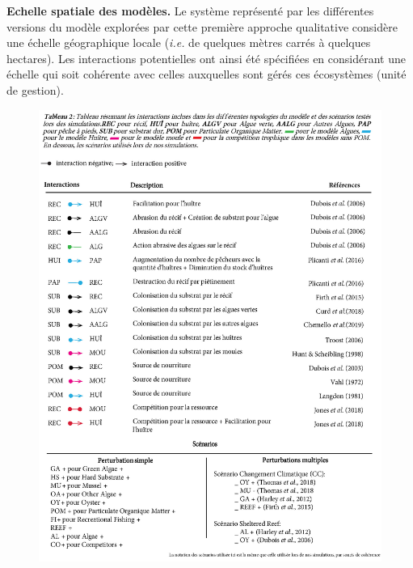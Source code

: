 \documentclass[12pt]{report}
\begin{document}
\textbf{Echelle spatiale des modèles.}
Le système représenté par les différentes versions du modèle explorées par cette première approche qualitative considère une échelle géographique locale (\textit{i.e.} de quelques mètres carrés à quelques hectares). Les interactions potentielles ont ainsi été spécifiées en considérant une échelle qui soit cohérente avec celles auxquelles sont gérés ces écosystèmes (unité de gestion). \newline
\begin{figure}
    \centering
    \includegraphics[width = \textwidth, height = \textheight]{references_models.jpg}
    \label{tab:2}
\end{figure}
\end{document}
